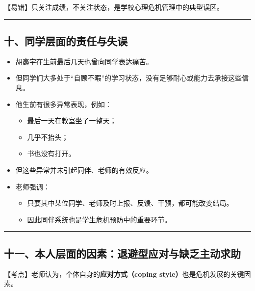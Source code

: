 \documentclass[
  chinese,
  9pt,
  a4paper,
]{ctexart}
\providecommand{\tightlist}{%
  \setlength{\itemsep}{0pt}\setlength{\parskip}{0pt}}
\begin{document}
【易错】只关注成绩，不关注状态，是学校心理危机管理中的典型误区。

\begin{center}\rule{0.5\linewidth}{0.5pt}\end{center}

\subsection{十、同学层面的责任与失误}\label{ux5341ux540cux5b66ux5c42ux9762ux7684ux8d23ux4efbux4e0eux5931ux8bef}

\begin{itemize}
\item
  胡鑫宇在生前最后几天也曾向同学表达痛苦。
\item
  但同学们大多处于``自顾不暇''的学习状态，没有足够耐心或能力去承接这些信息。
\item
  他生前有很多异常表现，例如：

  \begin{itemize}
  \tightlist
  \item
    最后一天在教室坐了一整天；
  \item
    几乎不抬头；
  \item
    书也没有打开。
  \end{itemize}
\item
  但这些异常并未引起同伴、老师的有效反应。
\item
  老师强调：

  \begin{itemize}
  \tightlist
  \item
    只要其中某位同学、老师及时上报、反馈、干预，都可能改变结局。
  \item
    因此同伴系统也是学生危机预防中的重要环节。
  \end{itemize}
\end{itemize}

\begin{center}\rule{0.5\linewidth}{0.5pt}\end{center}

\subsection{十一、本人层面的因素：退避型应对与缺乏主动求助}\label{ux5341ux4e00ux672cux4ebaux5c42ux9762ux7684ux56e0ux7d20ux9000ux907fux578bux5e94ux5bf9ux4e0eux7f3aux4e4fux4e3bux52a8ux6c42ux52a9}

【考点】老师认为，个体自身的\textbf{应对方式（coping
style）}也是危机发展的关键因素。
\end{document}
